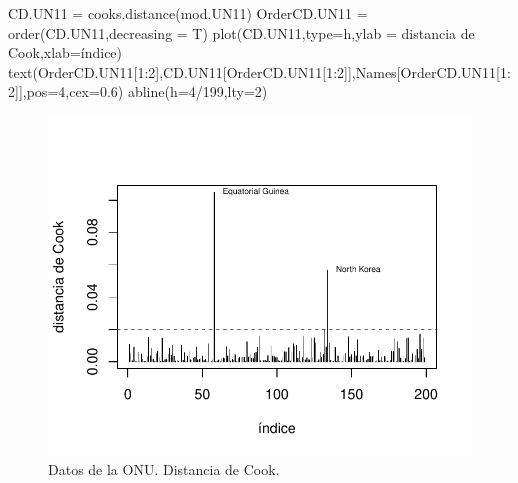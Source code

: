 \documentclass[
]{article}
\newenvironment{Shaded}{\begin{snugshade}}{\end{snugshade}}
\newcommand{\AttributeTok}[1]{\textcolor[rgb]{0.77,0.63,0.00}{#1}}
\newcommand{\DecValTok}[1]{\textcolor[rgb]{0.00,0.00,0.81}{#1}}
\newcommand{\FloatTok}[1]{\textcolor[rgb]{0.00,0.00,0.81}{#1}}
\newcommand{\FunctionTok}[1]{\textcolor[rgb]{0.00,0.00,0.00}{#1}}
\newcommand{\NormalTok}[1]{#1}
\newcommand{\OtherTok}[1]{\textcolor[rgb]{0.56,0.35,0.01}{#1}}
\newcommand{\SpecialCharTok}[1]{\textcolor[rgb]{0.00,0.00,0.00}{#1}}
\newcommand{\StringTok}[1]{\textcolor[rgb]{0.31,0.60,0.02}{#1}}
\begin{document}
\begin{Shaded}
\begin{Highlighting}[]
\NormalTok{CD.UN11 }\OtherTok{=} \FunctionTok{cooks.distance}\NormalTok{(mod.UN11)}
\NormalTok{OrderCD.UN11 }\OtherTok{=} \FunctionTok{order}\NormalTok{(CD.UN11,}\AttributeTok{decreasing =}\NormalTok{ T)}
\FunctionTok{plot}\NormalTok{(CD.UN11,}\AttributeTok{type=}\StringTok{\textquotesingle{}h\textquotesingle{}}\NormalTok{,}\AttributeTok{ylab =} \StringTok{\textquotesingle{}distancia de Cook\textquotesingle{}}\NormalTok{,}\AttributeTok{xlab=}\StringTok{\textquotesingle{}índice\textquotesingle{}}\NormalTok{)}
\FunctionTok{text}\NormalTok{(OrderCD.UN11[}\DecValTok{1}\SpecialCharTok{:}\DecValTok{2}\NormalTok{],CD.UN11[OrderCD.UN11[}\DecValTok{1}\SpecialCharTok{:}\DecValTok{2}\NormalTok{]],Names[OrderCD.UN11[}\DecValTok{1}\SpecialCharTok{:}\DecValTok{2}\NormalTok{]],}\AttributeTok{pos=}\DecValTok{4}\NormalTok{,}\AttributeTok{cex=}\FloatTok{0.6}\NormalTok{)}
\FunctionTok{abline}\NormalTok{(}\AttributeTok{h=}\DecValTok{4}\SpecialCharTok{/}\DecValTok{199}\NormalTok{,}\AttributeTok{lty=}\DecValTok{2}\NormalTok{)}
\end{Highlighting}
\end{Shaded}

\begin{figure}

{\centering \includegraphics{MLGI_files/figure-latex/Un11Cook-1} 

}

\caption{Datos de la ONU. Distancia de Cook.}\label{fig:Un11Cook}
\end{figure}
\end{document}
